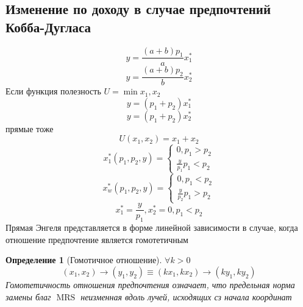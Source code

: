 \documentclass[14pt]{extarticle}
\newtheorem{definition}{Определение}
\DeclareMathOperator{\mrs}{MRS}
\begin{document}
 \subsection{Изменение по доходу в случае предпочтений Кобба-Дугласа}
 \begin{equation}
 y = \frac{( a + b )p_1}{a} x_1^{*}
 \end{equation} 
 \begin{equation}
 y = \frac{( a + b ) p_2}{b} x_2^{*}
 \end{equation} 
 Если функция полезность $U = \min {x_1,x_2}$
 \begin{equation}
 y = (p_1 + p_2) x_1^{*}
 \end{equation} 
 \begin{equation}
	 y = (p_1 + p_2) x_2 ^{*}
 \end{equation} 
 прямые тоже
 \begin{equation}
 U(x_1,x_2) = x_1 + x_2
 \end{equation} 
 \begin{equation}
 x_1^{*}(p_1,p_2,y) =
 \begin{cases}
 	0, p_1 > p_2\\
	\frac{y}{p_1} p_1 < p_2
 \end{cases}
 \end{equation} 
 \begin{equation}
 x_w^{*}(p_1,p_2,y) =
 \begin{cases}
 	0, p_1 < p_2\\
	\frac{y}{p_2} p_1 > p_2
 \end{cases}
 \end{equation} 
 \begin{equation}
 x_1^{*} = \frac{y}{p_1} ,x_2^{*} = 0 , p_1 < p_2
 \end{equation} 
 Прямая Энгеля представляется в форме
 линейной зависимости в случае, когда отношение
 предпочтение является гомотетичным
 \begin{definition}[Гомотичное отношение]
	 $\forall  k > 0$ 
	 \begin{equation}
		 (x_1,x_2) \to (y_1,y_2) \equiv
		 (kx_1,kx_2) \to (ky_1,ky_2)
	 \end{equation} 
	 Гомотетичность отношения предпочтения
	 означает,  что предельная норма замены
	 благ $\mrs$ неизменная вдоль лучей, исходящих
	 сз начала координат
 \end{definition}
\end{document}
